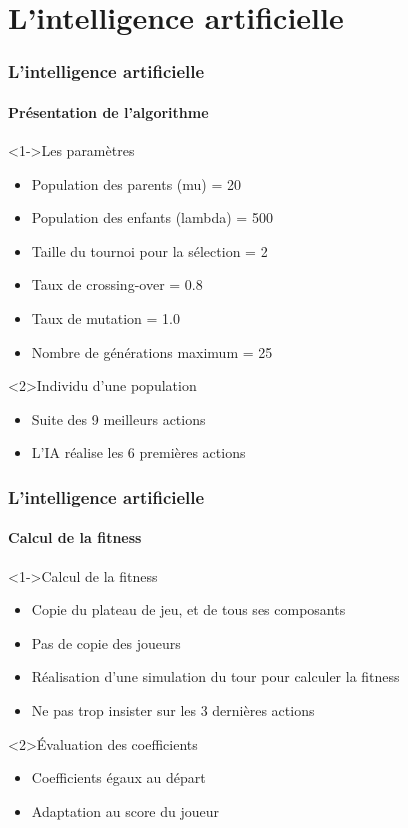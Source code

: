 \section{L'intelligence artificielle}

\begin{frame}
	\frametitle{L'intelligence artificielle}
	\framesubtitle{Présentation de l'algorithme}
	
	\begin{block}<1->{Les paramètres}
		\begin{itemize}
			\item Population des parents (mu) = 20
			\item Population des enfants (lambda) = 500
			\item Taille du tournoi pour la sélection = 2
			\item Taux de crossing-over = 0.8
			\item Taux de mutation = 1.0
			\item Nombre de générations maximum = 25
		\end{itemize}
	\end{block}	
	
	\begin{exampleblock}{Individu d'une population}
		\begin{itemize}
			\item Suite des 9 meilleurs actions
			\item L'IA réalise les 6 premières actions
		\end{itemize}
	\end{exampleblock}	
\end{frame}

\begin{frame}
	\frametitle{L'intelligence artificielle}
	\framesubtitle{Calcul de la fitness}
	
	\begin{block}<1->{Calcul de la fitness}
		\begin{itemize}
			\item Copie du plateau de jeu, et de tous ses composants
			\item Pas de copie des joueurs
			\item Réalisation d'une simulation du tour pour calculer la fitness
			\item Ne pas trop insister sur les 3 dernières actions
		\end{itemize}
	\end{block}

	\begin{block}{Évaluation des coefficients}
		\begin{itemize}
			\item Coefficients égaux au départ
			\item Adaptation au score du joueur
		\end{itemize}
	\end{block}
\end{frame}

